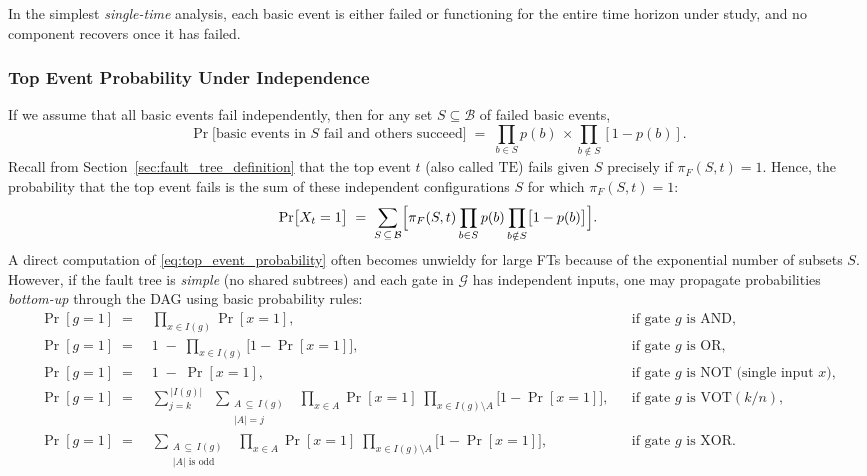 In the simplest \emph{single-time} analysis, each basic event is either failed or functioning for the entire time horizon under study, and no component recovers once it has failed.

\subsubsection{Top Event Probability Under Independence}

If we assume that all basic events fail independently, then for any set \(S \subseteq \mathcal{B}\) of failed basic events,
\[
\Pr\bigl[\text{basic events in }S\text{ fail and others succeed}\bigr]
\;=\;
\prod_{b \in S} p(b)\,\times\!\!\prod_{b \notin S} [1 - p(b)].
\]
Recall from Section~\ref{sec:fault_tree_definition} that the top event \(t\) (also called \(\mathrm{TE}\)) fails given \(S\) precisely if \(\pi_F(S, t)=1\).  Hence, the probability that the top event fails is the sum of these independent configurations \(S\) for which \(\pi_F(S,t)=1\):
\begin{equation}
\label{eq:top_event_probability}
\Pr\bigl[X_t=1\bigr]
\;=\;
\sum_{S\,\subseteq\,\mathcal{B}}
\Bigl[
    \pi_F(S,t)
    \prod_{b \in S} p(b)
    \prod_{b \notin S} \bigl[1 - p(b)\bigr]
\Bigr].
\end{equation}
A direct computation of \eqref{eq:top_event_probability} often becomes unwieldy for large FTs because of the exponential number of subsets \(S\).  However, if the fault tree is \emph{simple} (no shared subtrees) and each gate in \(\mathcal{G}\) has independent inputs, one may propagate probabilities \emph{bottom-up} through the DAG using basic probability rules:
\[
\begin{aligned}
\Pr[g=1] \;=\;& \prod_{x \in I(g)} \Pr[x=1],
&&\text{if gate \(g\) is AND,}\\[6pt]
\Pr[g=1] \;=\;& 1 \;-\; \prod_{x \in I(g)}\bigl[1-\Pr[x=1]\bigr],
&&\text{if gate \(g\) is OR,}\\[6pt]
\Pr[g=1] \;=\;& 1 \;-\; \Pr[x=1],
&&\text{if gate \(g\) is NOT (single input \(x\)),}\\[6pt]
\Pr[g=1] \;=\;& \displaystyle \sum_{j=k}^{\,|I(g)|}
\;\;\sum_{\substack{A\,\subseteq\,I(g)\\|A|=j}}
\;\;\prod_{x\in A}\Pr[x=1]\;\prod_{x\in I(g)\setminus A}\bigl[1-\Pr[x=1]\bigr],
&&\text{if gate \(g\) is \(\mathrm{VOT}(k/n)\),}\\[6pt]
\Pr[g=1] \;=\;& \displaystyle \sum_{\substack{A\,\subseteq\,I(g)\\\text{\(|A|\) is odd}}}
\;\;\prod_{x\in A}\Pr[x=1]\;\prod_{x\in I(g)\setminus A}\bigl[1-\Pr[x=1]\bigr],
&&\text{if gate \(g\) is XOR.}
\end{aligned}
\]
